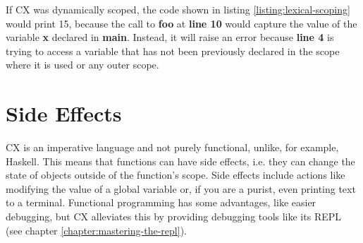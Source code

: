 \documentclass[11pt,fleqn,openany]{book} %
\begin{document}
If CX was dynamically scoped, the code shown in listing \ref{listing:lexical-scoping} would print 15, because the call to \textbf{foo} at \textbf{line 10} would capture the value of the variable \textbf{x} declared in \textbf{main}. Instead, it will raise an error because \textbf{line 4} is trying to access a variable that has not been previously declared in the scope where it is used or any outer scope.

\section{Side Effects}


CX is an imperative language and not purely functional, unlike, for example, Haskell. This means that functions can have side effects, i.e. they can change the state of objects outside of the function's scope. Side effects include actions like modifying the value of a global variable or, if you are a purist, even printing text to a terminal. Functional programming has some advantages, like easier debugging, but CX alleviates this by providing debugging tools like its REPL (see chapter \ref{chapter:mastering-the-repl}).%

\end{document}
